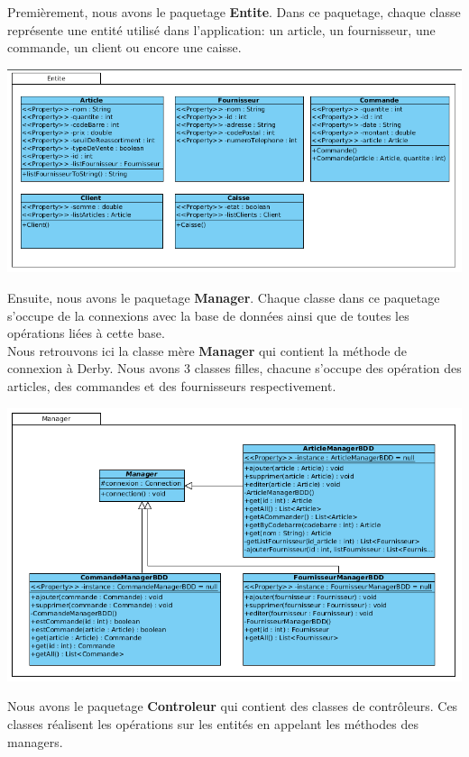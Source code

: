 Premièrement, nous avons le paquetage \textbf{Entite}. Dans ce paquetage, chaque classe représente une entité utilisé dans l'application: un article, un fournisseur, une commande, un client ou encore une caisse.

\begin{center}
\includegraphics[width=14cm]{./Conception/entite}
\end{center}

Ensuite, nous avons le paquetage \textbf{Manager}. Chaque classe dans ce paquetage s'occupe de la connexions avec la base de données ainsi que de toutes les opérations liées à cette base.\\
Nous retrouvons ici la classe mère \textbf{Manager} qui contient la méthode de connexion à Derby. Nous avons 3 classes filles, chacune s'occupe des opération des articles, des commandes et des fournisseurs respectivement.

\begin{center}
\includegraphics[width=14cm]{./Conception/manager}
\end{center}

Nous avons le paquetage \textbf{Controleur} qui contient des classes de contrôleurs. Ces classes réalisent les opérations sur les entités en appelant les méthodes des managers.

